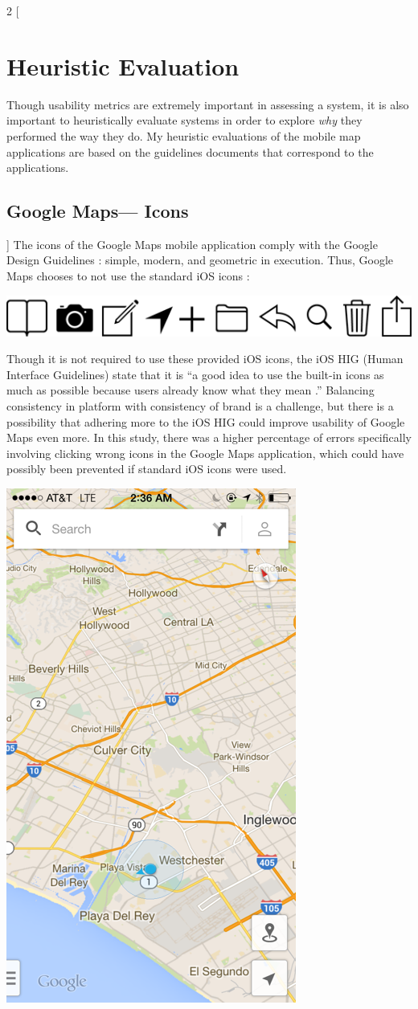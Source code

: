 \documentclass[a4paper; 11pt]{article}
\begin{document}
\begin{multicols}{2}
[
\section{Heuristic Evaluation}
Though usability metrics are extremely important in assessing a system, it is also important to heuristically evaluate systems in order to explore \textit{why} they performed the way they do.
My heuristic evaluations of the mobile map applications are based on the guidelines documents that correspond to the applications.
\subsection{Google Maps--- Icons}
]
The icons of the Google Maps mobile application comply with the Google Design Guidelines \cite{Google}: simple, modern, and geometric in execution. Thus, Google Maps chooses to not use the standard iOS icons \cite{Apple}:
\begin{center}
\includegraphics[width=.35\textwidth]{ios-bar-icons.png}
\end{center}
Though it is not required to use these provided iOS icons, the iOS HIG (Human Interface Guidelines) state that it is ``a good idea to use the built-in icons as much as possible because users already know what they mean \cite{Apple}.'' Balancing consistency in platform with consistency of brand is a challenge, but there is a possibility that adhering more to the iOS HIG could improve usability of Google Maps even more. In this study, there was a higher percentage of errors specifically involving clicking wrong icons in the Google Maps application, which could have possibly been prevented if standard iOS icons were used. %
\begin{center}
\includegraphics[width=.5\textwidth]{google-maps.png}
\end{center}
\end{multicols}
\end{document}
